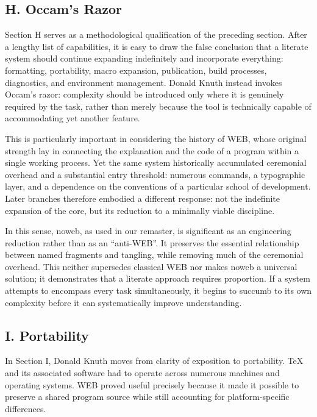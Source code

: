 \documentclass{ZGJournalArticle_2026}
\begin{document}
\subsection{H. Occam's Razor}\label{h.-occams-razor}

Section H serves as a methodological qualification of the preceding
section. After a lengthy list of capabilities, it is easy to draw the
false conclusion that a literate system should continue expanding
indefinitely and incorporate everything: formatting, portability, macro
expansion, publication, build processes, diagnostics, and environment
management. Donald Knuth instead invokes Occam's razor: complexity
should be introduced only where it is genuinely required by the task,
rather than merely because the tool is technically capable of
accommodating yet another feature.

This is particularly important in considering the history of WEB, whose
original strength lay in connecting the explanation and the code of a
program within a single working process. Yet the same system
historically accumulated ceremonial overhead and a substantial entry
threshold: numerous commands, a typographic layer, and a dependence on
the conventions of a particular school of development. Later branches
therefore embodied a different response: not the indefinite expansion of
the core, but its reduction to a minimally viable discipline.

In this sense, noweb, as used in our remaster, is significant as an
engineering reduction rather than as an ``anti-WEB''. It preserves the
essential relationship between named fragments and tangling, while
removing much of the ceremonial overhead. This neither supersedes
classical WEB nor makes noweb a universal solution; it demonstrates that
a literate approach requires proportion. If a system attempts to
encompass every task simultaneously, it begins to succumb to its own
complexity before it can systematically improve understanding.

\subsection{I. Portability}\label{i.-portability}

In Section I, Donald Knuth moves from clarity of exposition to
portability. TeX and its associated software had to operate across
numerous machines and operating systems. WEB proved useful precisely
because it made it possible to preserve a shared program source while
still accounting for platform-specific differences.
\end{document}

